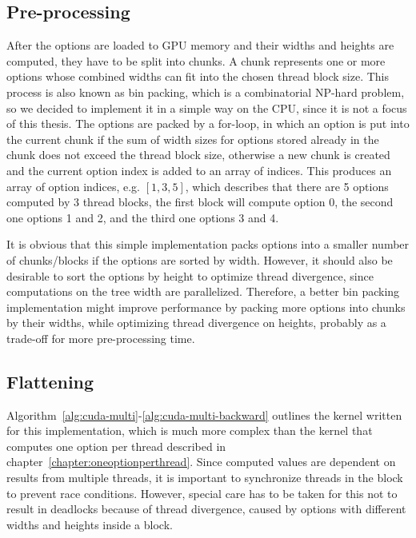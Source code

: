 \subsection{Pre-processing}
\label{section:cudamulti:preprocessing}
After the options are loaded to GPU memory and their widths and heights are computed, they have to be split into chunks. A chunk represents one or more options whose combined widths can fit into the chosen thread block size. This process is also known as bin packing, which is a combinatorial NP-hard problem, so we decided to implement it in a simple way on the CPU, since it is not a focus of this thesis. The options are packed by a for-loop, in which an option is put into the current chunk if the sum of width sizes for options stored already in the chunk does not exceed the thread block size, otherwise a new chunk is created and the current option index is added to an array of indices. This produces an array of option indices, e.g. $[1, 3, 5]$, which describes that there are 5 options computed by 3 thread blocks, the first block will compute option 0, the second one options 1 and 2, and the third one options 3 and 4.

It is obvious that this simple implementation packs options into a smaller number of chunks/blocks if the options are sorted by width. However, it should also be desirable to sort the options by height to optimize thread divergence, since computations on the tree width are parallelized. Therefore, a better bin packing implementation might improve performance by packing more options into chunks by their widths, while optimizing thread divergence on heights, probably as a trade-off for more pre-processing time.

\subsection{Flattening}
Algorithm~\ref{alg:cuda-multi}-\ref{alg:cuda-multi-backward} outlines the kernel written for this implementation, which is much more complex than the kernel that computes one option per thread described in chapter~\ref{chapter:oneoptionperthread}. Since computed values are dependent on results from multiple threads, it is important to synchronize threads in the block to prevent race conditions. However, special care has to be taken for this not to result in deadlocks because of thread divergence, caused by options with different widths and heights inside a block. 

